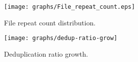 
\begin{figure}[t]
	\centering
	\begin{minipage}{0.273\textwidth}
		\centering
		\texttt{[image: graphs/File\_repeat\_count.eps]}
		\caption{File repeat count distribution.
		}
		\label{fig:file-repeat-cnt}
	\end{minipage}
	\begin{minipage}{0.2\textwidth}
		\centering
		\texttt{[image: graphs/dedup-ratio-grow]} 
		\caption{Deduplication ratio growth.
		} 
		\label{fig:dedup-ratio-growth}
	\end{minipage}
\end{figure}

